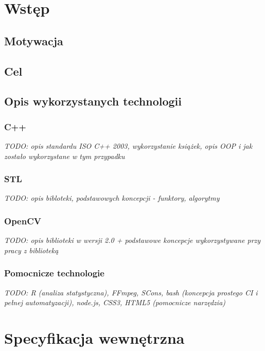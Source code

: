 \chapter{Wstęp}\label{Chapter_Wstep}

\section{Motywacja}\label{Section_Motywacja}

\section{Cel}\label{Section_Cel}

\section{Opis wykorzystanych technologii}\label{Section_Technologie}

\subsection{C++}\label{Subsection_Cpp}
\textit{TODO: opis standardu ISO C++ 2003, wykorzystanie książek, opis OOP i jak zostało wykorzystane w tym przypadku}
\cite{CppStroustrup}
\cite{EffectiveCpp}
\cite{MoreEffectiveCpp}

\subsection{STL}\label{Subsection_STL}
\textit{TODO: opis bibloteki, podstawowych koncepcji - funktory, algorytmy}
\cite{EffectiveStl}

\subsection{OpenCV}\label{Subsection_OpenCV}
\textit{TODO: opis biblioteki w wersji 2.0 + podstawowe koncepcje wykorzystywane przy pracy z biblioteką}
\cite{LearningOpenCV}
\cite{OpenCVCookbook}

\subsection{Pomocnicze technologie}\label{Subsection_PomocniczeTechnologie}
\textit{TODO: R (analiza statystyczna), FFmpeg, SCons, bash (koncepcja prostego CI i pełnej automatyzacji), node.js, CSS3, HTML5 (pomocnicze narzędzia)}

\chapter{Specyfikacja wewnętrzna}\label{Chapter_SpecyfikacjaWewnetrzna}

